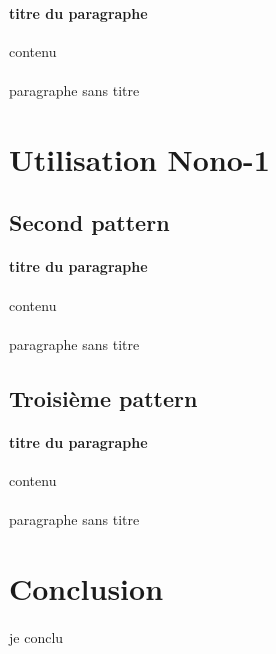\documentclass[a4paper]{article}
\begin{document}
			\paragraph{titre du paragraphe}{contenu}
			\paragraph{}{paragraphe sans titre}
		
	\section{Utilisation Nono-1}
	
		\subsection{Second pattern}
			\paragraph{titre du paragraphe}{contenu}
			\paragraph{}{paragraphe sans titre}
		
			\subsection{Troisième pattern}
			\paragraph{titre du paragraphe}{contenu}
			\paragraph{}{paragraphe sans titre}
	
	
	\section*{Conclusion}
		\paragraph{}{je conclu}
		
\end{document}
